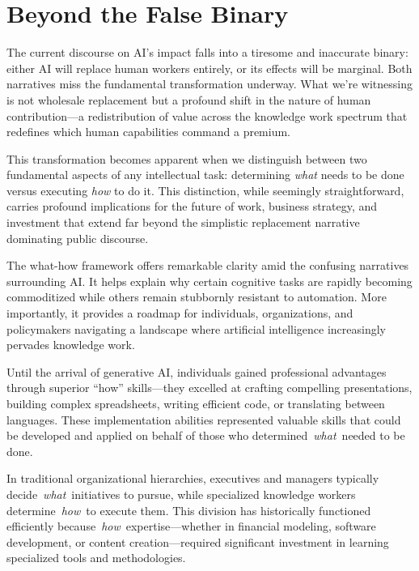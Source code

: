 \documentclass[
  Letterpaper,
]{scrbook}
\begin{document}
\section{Beyond the False Binary}\label{beyond-the-false-binary}

The current discourse on AI's impact falls into a tiresome and
inaccurate binary: either AI will replace human workers entirely, or its
effects will be marginal. Both narratives miss the fundamental
transformation underway. What we're witnessing is not wholesale
replacement but a profound shift in the nature of human contribution---a
redistribution of value across the knowledge work spectrum that
redefines which human capabilities command a premium.

This transformation becomes apparent when we distinguish between two
fundamental aspects of any intellectual task: determining \emph{what}
needs to be done versus executing \emph{how} to do it. This distinction,
while seemingly straightforward, carries profound implications for the
future of work, business strategy, and investment that extend far beyond
the simplistic replacement narrative dominating public discourse.

The what-how framework offers remarkable clarity amid the confusing
narratives surrounding AI. It helps explain why certain cognitive tasks
are rapidly becoming commoditized while others remain stubbornly
resistant to automation. More importantly, it provides a roadmap for
individuals, organizations, and policymakers navigating a landscape
where artificial intelligence increasingly pervades knowledge work.

Until the arrival of generative AI, individuals gained professional
advantages through superior ``how'' skills---they excelled at crafting
compelling presentations, building complex spreadsheets, writing
efficient code, or translating between languages. These implementation
abilities represented valuable skills that could be developed and
applied on behalf of those who determined~\emph{what}~needed to be done.

In traditional organizational hierarchies, executives and managers
typically decide~\emph{what}~initiatives to pursue, while specialized
knowledge workers determine~\emph{how}~to execute them. This division
has historically functioned efficiently
because~\emph{how}~expertise---whether in financial modeling, software
development, or content creation---required significant investment in
learning specialized tools and methodologies.
\end{document}
